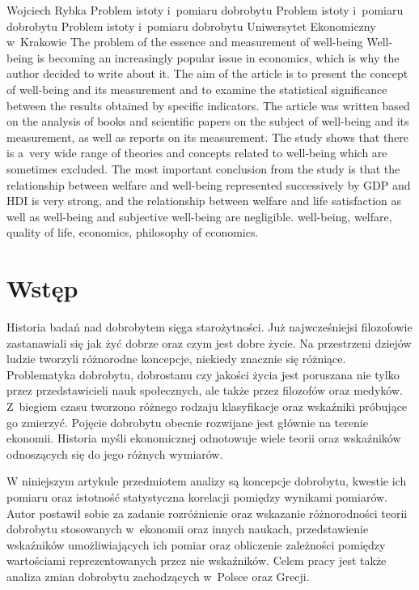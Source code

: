 \begin{artplenv}{Wojciech Rybka}
	{Problem istoty i~pomiaru dobrobytu}
	{Problem istoty i~pomiaru dobrobytu}
	{Problem istoty i~pomiaru dobrobytu}
	{Uniwersytet Ekonomiczny w~Krakowie}
	{The problem of the essence and measurement of well-being}
	{Well-being is becoming an increasingly popular issue in economics, which is why the author decided to write about it. The aim of the article is to present the concept of well-being and its measurement and to examine the statistical significance between the results obtained by specific indicators. The article was written based on the analysis of books and scientific papers on the subject of well-being and its measurement, as well as reports on its measurement. The study shows that there is a~very wide range of theories and concepts related to well-being which are sometimes excluded. The most important conclusion from the study is that the relationship between welfare and well-being represented successively by GDP and HDI is very strong, and the relationship between welfare and life satisfaction as well as well-being and subjective well-being are negligible.}
	{well-being, welfare, quality of life, economics, philosophy of economics.}



\section*{Wstęp}
\lettrine[loversize=0.13,lines=2,lraise=-0.05,nindent=0em,findent=0.2pt]%
{H}{}istoria badań nad dobrobytem sięga starożytności. Już najwcześniejsi filozofowie zastanawiali się jak żyć dobrze oraz
czym jest dobre życie. Na przestrzeni dziejów ludzie tworzyli różnorodne koncepcje, niekiedy znacznie się różniące.
Problematyka dobrobytu, dobrostanu czy jakości życia jest poruszana nie tylko przez przedstawicieli nauk społecznych,
ale także przez filozofów oraz medyków. Z~biegiem czasu tworzono różnego rodzaju klasyfikacje oraz wskaźniki próbujące
go zmierzyć. Pojęcie dobrobytu obecnie rozwijane jest głównie na terenie ekonomii. Historia myśli ekonomicznej
odnotowuje wiele teorii oraz wskaźników odnoszących się do jego różnych wymiarów.

W niniejszym artykule przedmiotem analizy są koncepcje dobrobytu, kwestie ich pomiaru oraz istotność statystyczna
korelacji pomiędzy wynikami pomiarów. Autor postawił sobie za zadanie rozróżnienie oraz wskazanie różnorodności teorii
dobrobytu stosowanych w~ekonomii oraz innych naukach, przedstawienie wskaźników umożliwiających ich pomiar oraz
obliczenie zależności pomiędzy wartościami reprezentowanych przez nie wskaźników. Celem pracy jest także analiza zmian
dobrobytu zachodzących w~Polsce oraz Grecji. 


\end{artplenv}
